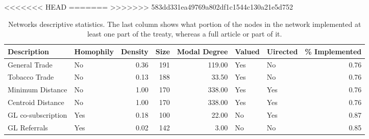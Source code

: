 <<<<<<< HEAD
=======
>>>>>>> 583dd331ea49769a802df1c1544c130a21e5d752
\begin{table}[ht]
\centering
\begin{tabular}{llrrrllr}
  \toprule
Description & Homophily & Density & Size & Modal Degree & Valued & Uirected & \% Implemented \\ 
  \midrule
General Trade & No & 0.36 & 191 & 119.00 & Yes & No & 0.76 \\ 
  Tobacco Trade & No & 0.13 & 188 & 33.50 & Yes & No & 0.76 \\ 
  Minimum Distance & No & 1.00 & 170 & 338.00 & Yes & Yes & 0.76 \\ 
  Centroid Distance & No & 1.00 & 170 & 338.00 & Yes & Yes & 0.76 \\ 
  GL co-subscription & Yes & 0.18 & 100 & 22.00 & No & Yes & 0.87 \\ 
  GL Referrals  & Yes & 0.02 & 142 & 3.00 & No & No & 0.85 \\ 
   \bottomrule
\end{tabular}
\caption{Networks descriptive statistics. The last column shows what portion of the nodes in the network implemented at least one part of the treaty, whereas a full article or part of it.} 
\end{table}
